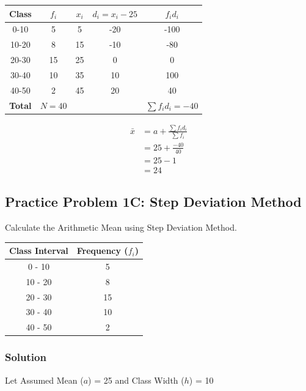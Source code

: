 \documentclass[12pt, a4paper]{article}
\begin{document}
\begin{center}
\begin{tabular}{|c|c|c|c|c|}
\hline
\textbf{Class} & $f_i$ & $x_i$ & $d_i = x_i - 25$ & $f_i d_i$ \\ \hline
0-10 & 5 & 5 & -20 & -100 \\ \hline
10-20 & 8 & 15 & -10 & -80 \\ \hline
20-30 & 15 & 25 & 0 & 0 \\ \hline
30-40 & 10 & 35 & 10 & 100 \\ \hline
40-50 & 2 & 45 & 20 & 40 \\ \hline
\textbf{Total} & $N=40$ & & & $\sum f_i d_i = -40$ \\ \hline
\end{tabular}
\end{center}

\begin{align*}
\bar{x} &= a + \frac{\sum f_i d_i}{\sum f_i} \\
        &= 25 + \frac{-40}{40} \\
        &= 25 - 1 \\
        &= 24
\end{align*}

\hrulefill

\subsection*{Practice Problem 1C: Step Deviation Method}
Calculate the Arithmetic Mean using Step Deviation Method.
\begin{center}
\begin{tabular}{|c|c|}
\hline
\textbf{Class Interval} & \textbf{Frequency ($f_i$)} \\ \hline
0 - 10 & 5 \\ \hline
10 - 20 & 8 \\ \hline
20 - 30 & 15 \\ \hline
30 - 40 & 10 \\ \hline
40 - 50 & 2 \\ \hline
\end{tabular}
\end{center}

\subsubsection*{Solution}
Let Assumed Mean ($a$) = 25 and Class Width ($h$) = 10
\end{document}
